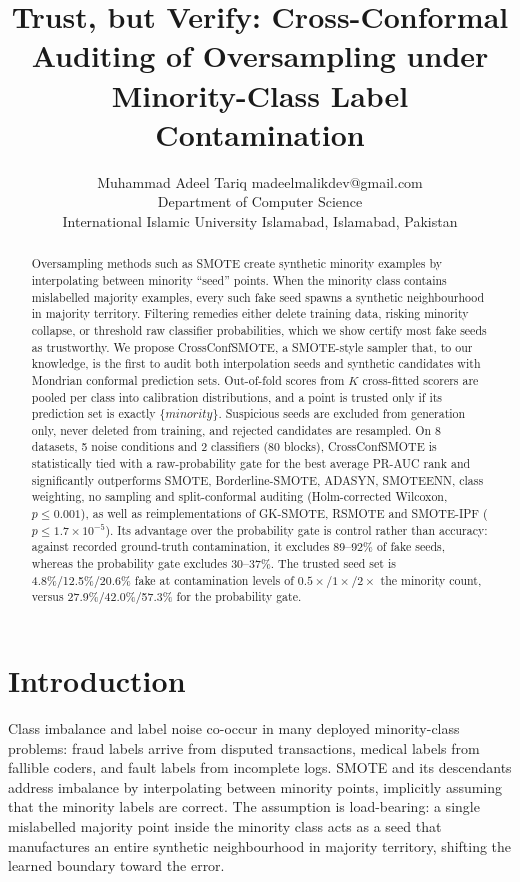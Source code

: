 \documentclass[10pt]{article} %
\title{Trust, but Verify: Cross-Conformal Auditing of Oversampling under Minority-Class Label Contamination}
\author{\name Muhammad Adeel Tariq \email madeelmalikdev@gmail.com \\
      \addr Department of Computer Science\\
      International Islamic University Islamabad, Islamabad, Pakistan}
\begin{document}
\maketitle

\begin{abstract}
Oversampling methods such as SMOTE create synthetic minority examples by interpolating between minority ``seed'' points. When the minority class contains mislabelled majority examples, every such fake seed spawns a synthetic neighbourhood in majority territory. Filtering remedies either delete training data, risking minority collapse, or threshold raw classifier probabilities, which we show certify most fake seeds as trustworthy. We propose CrossConfSMOTE, a SMOTE-style sampler that, to our knowledge, is the first to audit both interpolation seeds and synthetic candidates with Mondrian conformal prediction sets. Out-of-fold scores from $K$ cross-fitted scorers are pooled per class into calibration distributions, and a point is trusted only if its prediction set is exactly $\{\textit{minority}\}$. Suspicious seeds are excluded from generation only, never deleted from training, and rejected candidates are resampled. On 8 datasets, 5 noise conditions and 2 classifiers (80 blocks), CrossConfSMOTE is statistically tied with a raw-probability gate for the best average PR-AUC rank and significantly outperforms SMOTE, Borderline-SMOTE, ADASYN, SMOTEENN, class weighting, no sampling and split-conformal auditing (Holm-corrected Wilcoxon, $p \le 0.001$), as well as reimplementations of GK-SMOTE, RSMOTE and SMOTE-IPF ($p \le 1.7 \times 10^{-5}$). Its advantage over the probability gate is control rather than accuracy: against recorded ground-truth contamination, it excludes 89--92\% of fake seeds, whereas the probability gate excludes 30--37\%. The trusted seed set is 4.8\%/12.5\%/20.6\% fake at contamination levels of $0.5\times$/$1\times$/$2\times$ the minority count, versus 27.9\%/42.0\%/57.3\% for the probability gate.
\end{abstract}

\section{Introduction}

Class imbalance and label noise co-occur in many deployed minority-class problems: fraud labels arrive from disputed transactions, medical labels from fallible coders, and fault labels from incomplete logs. SMOTE \citep{chawla2002smote} and its descendants address imbalance by interpolating between minority points, implicitly assuming that the minority labels are correct. The assumption is load-bearing: a single mislabelled majority point inside the minority class acts as a seed that manufactures an entire synthetic neighbourhood in majority territory, shifting the learned boundary toward the error.
\end{document}
